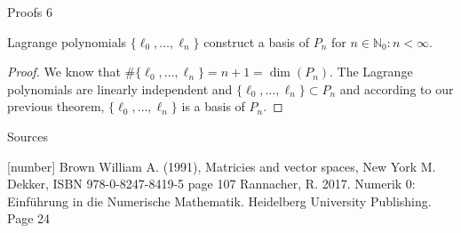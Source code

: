 \documentclass[8pt]{beamer}
\begin{document}
		\begin{frame}{Proofs 6}
			\begin{theorem}
				Lagrange polynomials $\{\ell_0,\ldots, \ell_n\}$ construct a basis of $P_n$ for $n \in \mathbb{N}_0: n < \infty$.
			\end{theorem}
			\begin{proof}
				We know that $\#\{\ell_0,\ldots, \ell_n\} = n+1 = \dim(P_n)$. The Lagrange polynomials are linearly independent and $\{\ell_0,\ldots, \ell_n\} \subset P_n$ and according to our previous theorem, $\{\ell_0,\ldots, \ell_n\}$ is a basis of $P_n$.
			\end{proof}
		\end{frame}
		\begin{frame}{Sources}
			\begin{thebibliography}{9}
				[number]
				Brown William A. (1991), Matricies and vector spaces, New York M. Dekker, ISBN 978-0-8247-8419-5 page 107
				Rannacher, R. 2017. Numerik 0: Einführung in die Numerische Mathematik. Heidelberg University Publishing. Page 24
			\end{thebibliography}
		\end{frame}
													
\end{document}
